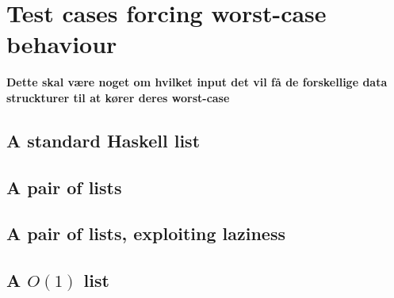 \section*{Test cases forcing worst-case behaviour}
\textbf{Dette skal være noget om hvilket input det vil få de forskellige data struckturer til at kører deres worst-case}

\subsection*{A standard Haskell list}
\subsection*{A pair of lists}
\subsection*{A pair of lists, exploiting laziness}
\subsection*{A $O(1)$ list}